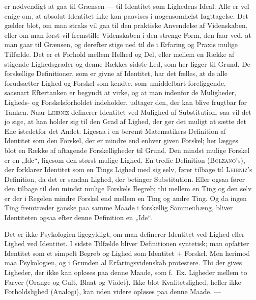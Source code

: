 \documentclass[12pt]{article}
\newcommand{\opage}[1]{\marginnote{\footnotesize\textit{[#1]}}}
\begin{document}
er nødvendigt at gaa til Grænsen --- til Identitet som Lighedens Ideal. Alle er
vel enige om, at absolut Identitet ikke kan paavises i nogensomhelst
Iagttagelse. Det gælder blot, om man straks vil gaa til den praktiske Anvendelse
af Videnskaben, eller om man først vil fremstille Videnskaben i den strenge Form,
den faar ved, at man gaar til Grænsen, og derefter stige ned til de i Erfaring
og Praxis mulige Tilfælde. Det er et Forhold mellem Helhed og Del, eller mellem
en Række af stigende Lighedsgrader og denne Rækkes sidste Led, som her ligger
til Grund. De forskellige Definitioner, som er givne af Identitet, har det
fælles, at de alle forudsætter Lighed og Forskel som kendte, som umiddelbart
foreliggende, saasnart Eftertanken er begyndt at virke, og at man indenfor de
Muligheder, Ligheds- og Forskelsforholdet indeholder, udtager den, der kan blive
frugtbar for Tanken. Naar \textsc{Leibniz} definerer Identitet ved Mulighed af
Substitution, saa vil det jo sige, at han holder sig til den Grad af Lighed, der
gør det muligt at sætte det Ene istedetfor
\opage{17}det Andet. Ligesaa i en berømt Matematikers Definition af Identitet
som den Forskel, der er mindre end enhver given Forskel; her lægges blot en
Række af aftagende Forskelligheder til Grund. Den mindst mulige Forskel er en
„Ide“, ligesom den størst mulige Lighed. En tredie Definition
(\textsc{Bolzano}'s), der forklarer Identitet som en Tings Lighed med sig selv,
fører tilbage til \textsc{Leibniz}'s Definition, da det er saadan Lighed, der
betinger Substitution. Eller ogsaa fører den tilbage til den mindst mulige
Forskels Begreb; thi mellem en Ting og den selv er der i Regelen mindre Forskel
end mellem en Ting og andre Ting. Og da ingen Ting fremtræder ganske paa samme
Maade i forskellig Sammenhæng, bliver Identiteten ogsaa efter denne Definition
en „Ide“.

Det er ikke Psykologien ligegyldigt, om man definerer Identitet ved Lighed eller
Lighed ved Identitet. I sidste Tilfælde bliver Definitionen syntetisk; man
opfatter Identitet som et simpelt Begreb og Lighed som Identitet $+$ Forskel.
Men herimod maa Psykologien, og i Grunden al Erfaringsvidenskab protestere. Thi
der gives Ligheder, der ikke kan opløses paa denne Maade, som f.~Ex. Ligheder
mellem to Farver (Orange og Gult, Blaat og Violet). Ikke blot
Kvalitetslighed, heller ikke Forholdslighed (Analogi), kan uden videre opløses
paa denne Maade. ---
\end{document}
